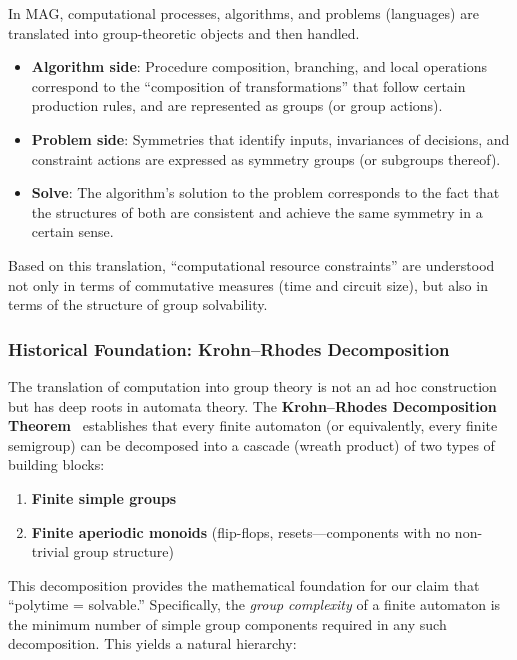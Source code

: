 \documentclass[11pt,a4paper]{article}
\theoremstyle{plain}
\theoremstyle{definition}
\begin{document}
In MAG, computational processes, algorithms, and problems (languages) are translated into group-theoretic objects and then handled.
\begin{itemize}[nosep]
\item \textbf{Algorithm side}: Procedure composition, branching, and local operations correspond to the ``composition of transformations'' that follow certain production rules, and are represented as groups (or group actions).
\item \textbf{Problem side}: Symmetries that identify inputs, invariances of decisions, and constraint actions are expressed as symmetry groups (or subgroups thereof).
\item \textbf{Solve}: The algorithm's solution to the problem corresponds to the fact that the structures of both are consistent and achieve the same symmetry in a certain sense.
\end{itemize}

Based on this translation, ``computational resource constraints'' are understood not only in terms of commutative measures (time and circuit size), but also in terms of the structure of group solvability.

\subsubsection{Historical Foundation: Krohn--Rhodes Decomposition}\label{sec:krohnrhodes}

The translation of computation into group theory is not an ad hoc construction but has deep roots in automata theory. The \textbf{Krohn--Rhodes Decomposition Theorem}~\cite{krohnrhodes1965} establishes that every finite automaton (or equivalently, every finite semigroup) can be decomposed into a cascade (wreath product) of two types of building blocks:

\begin{enumerate}[nosep]
\item \textbf{Finite simple groups}
\item \textbf{Finite aperiodic monoids} (flip-flops, resets---components with no non-trivial group structure)
\end{enumerate}

This decomposition provides the mathematical foundation for our claim that ``polytime = solvable.'' Specifically, the \emph{group complexity} of a finite automaton is the minimum number of simple group components required in any such decomposition. This yields a natural hierarchy:
\end{document}
